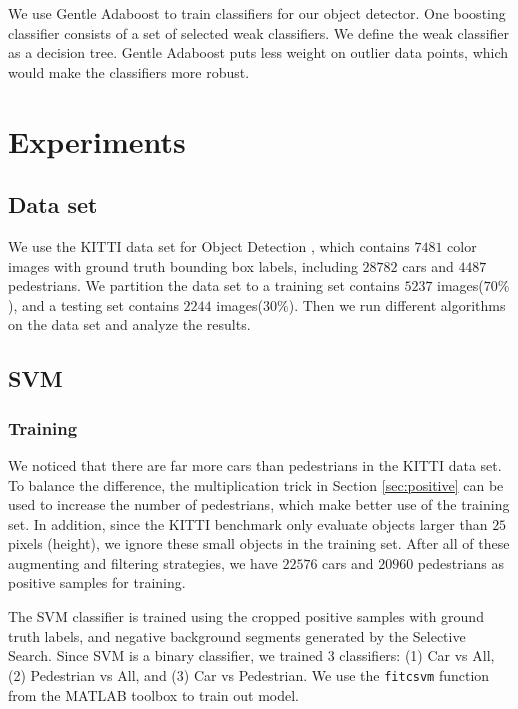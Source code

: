 \documentclass{article} %
\begin{document}
We use Gentle Adaboost \cite{Torralba04sharingfeatures:} to train classifiers for our object detector. One boosting classifier consists of a set of selected weak classifiers. We define the weak classifier as a decision tree. Gentle Adaboost puts less weight on outlier data points, which would make the classifiers more robust.

\section{Experiments}

\subsection{Data set}

We use the KITTI data set for Object Detection \cite{Geiger2012CVPR}, which contains $7481$ color images with ground truth bounding box labels, including $28782$ cars and $4487$ pedestrians. We partition the data set to a training set contains $5237$ images($70\%$), and a testing set contains $2244$ images($30\%$). Then we run different algorithms on the data set and analyze the results.

\subsection{SVM}

\subsubsection{Training}

We noticed that there are far more cars than pedestrians in the KITTI data set. To balance the difference, the multiplication trick in Section \ref{sec:positive} can be used to increase the number of pedestrians, which make better use of the training set. In addition, since the KITTI benchmark only evaluate objects larger than $25$ pixels (height), we ignore these small objects in the training set. After all of these augmenting and filtering strategies, we have $22576$ cars and $20960$ pedestrians as positive samples for training.

The SVM classifier is trained using the cropped positive samples with ground truth labels, and negative background segments generated by the Selective Search. Since SVM is a binary classifier, we trained 3 classifiers: (1) Car vs All, (2) Pedestrian vs All, and (3) Car vs Pedestrian. We use the \texttt{fitcsvm} function from the MATLAB toolbox to train out model.
\end{document}
